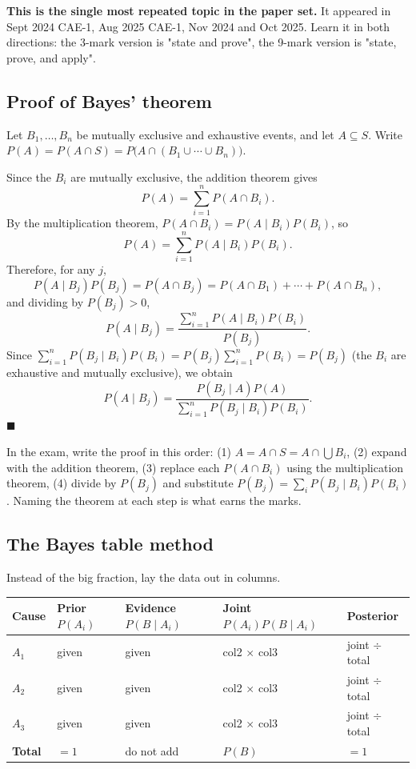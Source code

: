 \documentclass[11pt,a4paper]{article}
\begin{document}
\begin{exambox}
\textbf{This is the single most repeated topic in the paper set.} It appeared in Sept 2024 CAE-1, Aug 2025 CAE-1, Nov 2024 and Oct 2025. Learn it in both directions: the 3-mark version is "state and prove", the 9-mark version is "state, prove, and apply".
\end{exambox}

\subsection{Proof of Bayes' theorem}
Let $B_1,\dots,B_n$ be mutually exclusive and exhaustive events, and let $A\subseteq S$. Write $P(A)=P(A\cap S)=P\bigl(A\cap(B_1\cup\cdots\cup B_n)\bigr)$.

Since the $B_i$ are mutually exclusive, the addition theorem gives
\[
P(A)=\sum_{i=1}^{n}P(A\cap B_i).
\]
By the multiplication theorem, $P(A\cap B_i)=P(A\mid B_i)P(B_i)$, so
\[
P(A)=\sum_{i=1}^{n}P(A\mid B_i)P(B_i).
\]
Therefore, for any $j$,
\[
P(A\mid B_j)P(B_j)=P(A\cap B_j)=P(A\cap B_1)+\cdots+P(A\cap B_n),
\]
and dividing by $P(B_j)>0$,
\[
P(A\mid B_j)=\frac{\sum_{i=1}^{n}P(A\mid B_i)P(B_i)}{P(B_j)}.
\]
Since $\sum_{i=1}^{n}P(B_j\mid B_i)P(B_i)=P(B_j)\sum_{i=1}^{n}P(B_i)=P(B_j)$ (the $B_i$ are exhaustive and mutually exclusive), we obtain
\[
P(A\mid B_j)=\frac{P(B_j\mid A)P(A)}{\sum_{i=1}^{n}P(B_j\mid B_i)P(B_i)}.
\]
$\blacksquare$

\begin{rememberbox}
In the exam, write the proof in this order: (1) $A = A\cap S = A\cap\bigcup B_i$, (2) expand with the addition theorem, (3) replace each $P(A\cap B_i)$ using the multiplication theorem, (4) divide by $P(B_j)$ and substitute $P(B_j)=\sum_i P(B_j\mid B_i)P(B_i)$. Naming the theorem at each step is what earns the marks.
\end{rememberbox}

\subsection{The Bayes table method}
Instead of the big fraction, lay the data out in columns.

\begin{center}\small
\begin{tabularx}{\textwidth}{>{\bfseries}p{} p{} p{} X X}
\toprule Cause & Prior $P(A_i)$ & Evidence $P(B\mid A_i)$ & Joint $P(A_i)P(B\mid A_i)$ & Posterior\\\midrule
$A_1$ & given & given & col2 $\times$ col3 & joint $\div$ total\\
$A_2$ & given & given & col2 $\times$ col3 & joint $\div$ total\\
$A_3$ & given & given & col2 $\times$ col3 & joint $\div$ total\\\midrule
Total & $=1$ & do not add & $P(B)$ & $=1$\\
\end{tabularx}
\end{center}
\end{document}
